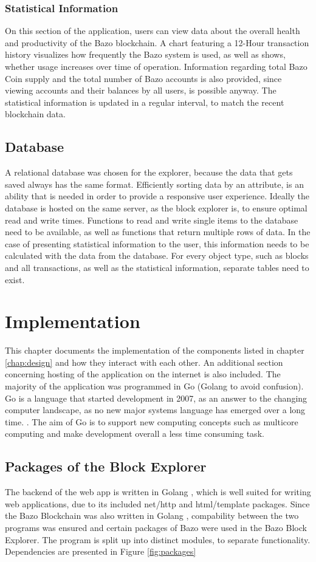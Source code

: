 \subsection{Statistical Information}
On this section of the application, users can view data about the overall health and productivity of the Bazo blockchain. A chart featuring a 12-Hour transaction history visualizes how frequently the Bazo system is used, as well as shows, whether usage increases over time of operation. Information regarding total Bazo Coin supply and the total number of Bazo accounts is also provided, since viewing accounts and their balances by all users, is possible anyway. The statistical information is updated in a regular interval, to match the recent blockchain data.

\section{Database}
A relational database was chosen for the explorer, because the data that gets saved always has the same format. Efficiently sorting data by an attribute, is an ability that is needed in order to provide a responsive user experience. Ideally the database is hosted on the same server, as the block explorer is, to ensure optimal read and write times. Functions to read and write single items to the database need to be available, as well as functions that return multiple rows of data. In the case of presenting statistical information to the user, this information needs to be calculated with the data from the database. For every object type, such as blocks and all transactions, as well as the statistical information, separate tables need to exist. 

\chapter{Implementation}
This chapter documents the implementation of the components listed in chapter \ref{chap:design} and how they interact with each other. An additional section concerning hosting of the application on the internet is also included. The majority of the application was programmed in Go (Golang to avoid confusion). Go is a language that started development in 2007, as an answer to the changing computer landscape, as no new major systems language has emerged over a long time. \cite{gohistory}. The aim of Go is to support new computing concepts such as multicore computing and make development overall a less time consuming task.
\section{Packages of the Block Explorer}
The backend of the web app is written in Golang \cite{golang}, which is well suited for writing web applications, due to its included net/http \cite{httppackage} and html/template \cite{template} packages. Since the Bazo Blockchain was also written in Golang \cite{bazo}, compability between the two programs was ensured and certain packages of Bazo were used in the Bazo Block Explorer. The program is split up into distinct modules, to separate functionality. Dependencies are presented in Figure \ref{fig:packages} 

